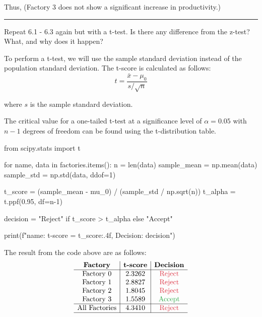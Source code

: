 \documentclass[a4paper, 10pt]{article}
\begin{document}
\begin{tosubmit}
Thus,  (Factory 3 does not show a significant increase in productivity.)

\vspace{3mm} \hrule \vspace{3mm}

\begin{subproblems}[resume]
    \item Repeat 6.1 - 6.3 again but with a t-test. Is there any difference from the z-test? What, and why does it happen?
\end{subproblems}

\par\noindent\submitsolution
To perform a t-test, we will use the sample standard deviation instead of the population standard deviation.
The t-score is calculated as follows:
\[ t = \frac{\bar{x} - \mu_0}{s / \sqrt{n}} \]

where \( s \) is the sample standard deviation.

The critical value for a one-tailed t-test at a significance level of \( \alpha = 0.05 \) with \( n-1 \) degrees of freedom can be found using the t-distribution table.
\begin{codingbox}
from scipy.stats import t

for name, data in factories.items():
    n = len(data)
    sample_mean = np.mean(data)
    sample_std = np.std(data, ddof=1)

    t_score = (sample_mean - mu_0) / (sample_std / np.sqrt(n))
    t_alpha = t.ppf(0.95, df=n-1)

    decision = "Reject" if t_score > t_alpha else "Accept"

    print(f"{name}: t-score = {t_score:.4f}, Decision: {decision}")
\end{codingbox}

The result from the code above are as follows:
\[
\begin{array}{c|c|c}
    \textbf{Factory} & \textbf{t-score} & \textbf{Decision} \\
    \hline
    \text{Factory 0} & 2.3262 & \textcolor[HTML]{DC3545}{\text{Reject}} \\
    \text{Factory 1} & 2.8827 & \textcolor[HTML]{DC3545}{\text{Reject}} \\
    \text{Factory 2} & 1.8045 & \textcolor[HTML]{DC3545}{\text{Reject}} \\
    \text{Factory 3} & 1.5589 & \textcolor[HTML]{28A745}{\text{Accept}} \\
    \hline
    \text{All Factories} & 4.3410 & \textcolor[HTML]{DC3545}{\text{Reject}} \\
    \hline
\end{array}
\]


\end{tosubmit}
\end{document}
